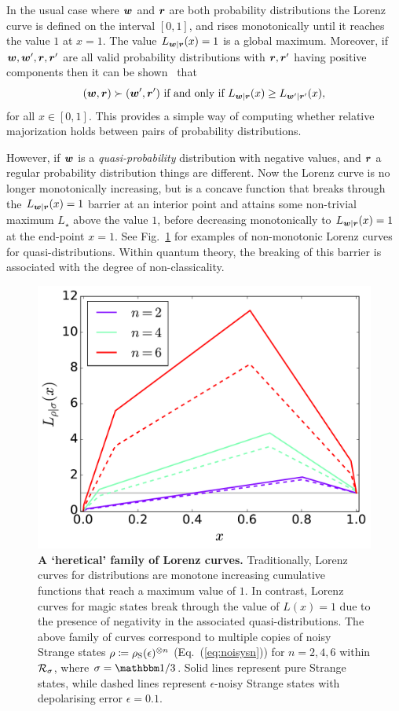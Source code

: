 \documentclass[pra,
aps,
twocolumn,
superscriptaddress,
groupedaddress,
nofootinbib,
reprint
]{revtex4-1}
\begin{document}
In the usual case where $\boldsymbol{w}$ and $\boldsymbol{r}$ are both probability distributions the Lorenz curve is defined on the interval $[0,1]$, and rises monotonically until it reaches the value $1$ at $x=1$. The value $L_{\boldsymbol{w}|\boldsymbol{r}}(x) = 1$ is a global maximum. Moreover, if $\boldsymbol{w}, \boldsymbol{w}', \boldsymbol{r}, \boldsymbol{r}'$ are all valid probability distributions with $\boldsymbol{r},\boldsymbol{r}'$ having positive components then it can be shown~\cite{ruch_mixing_1978} that
\begin{equation*}
(\boldsymbol{w}, \boldsymbol{r}) \succ (\boldsymbol{w}', \boldsymbol{r}') \mbox{ if and only if } L_{\boldsymbol{w} |\boldsymbol{r}}(x) \ge L_{\boldsymbol{w}' |\boldsymbol{r}'}(x),
\end{equation*}
for all $x \in [0,1]$.
This provides a simple way of computing whether relative majorization holds between pairs of probability distributions.

However, if $\boldsymbol{w}$ is a \emph{quasi-probability} distribution with negative values, and $\boldsymbol{r}$ a regular probability distribution things are different. Now the Lorenz curve is no longer monotonically increasing, but is a concave function that breaks through the $L_{\boldsymbol{w}|\boldsymbol{r}}(x) = 1$ barrier at an interior point and attains some non-trivial maximum $L_\star$ above the value $1$, before decreasing monotonically to $L_{\boldsymbol{w}|\boldsymbol{r}}(x)= 1$ at the end-point $x=1$. See Fig.~\ref{fig:lcs} for examples of non-monotonic Lorenz curves for quasi-distributions. Within quantum theory, the breaking of this barrier is associated with the degree of non-classicality.

\begin{figure}
    \centering
    \includegraphics[scale=0.35]{figs/lc_strange.pdf}
    \caption{\textbf{A `heretical' family of Lorenz curves.} Traditionally, Lorenz curves for distributions are monotone increasing cumulative functions that reach a maximum value of $1$. In contrast, Lorenz curves for magic states break through the value of $L(x)=1$ due to the presence of negativity in the associated quasi-distributions. The above family of curves correspond to multiple copies of noisy Strange states $\rho\coloneqq\rho_{\rm{S}}(\epsilon)^{\otimes n}$ (Eq.~(\ref{eq:noisysn})) for $n=2,4,6$ within ${\mathcal R}_{\sigma}$, where $\sigma = \id/3$. Solid lines represent pure Strange states, while dashed lines represent $\epsilon$-noisy Strange states with depolarising error $\epsilon = 0.1$.
    }
    \label{fig:lcs}
\end{figure}
\end{document}
